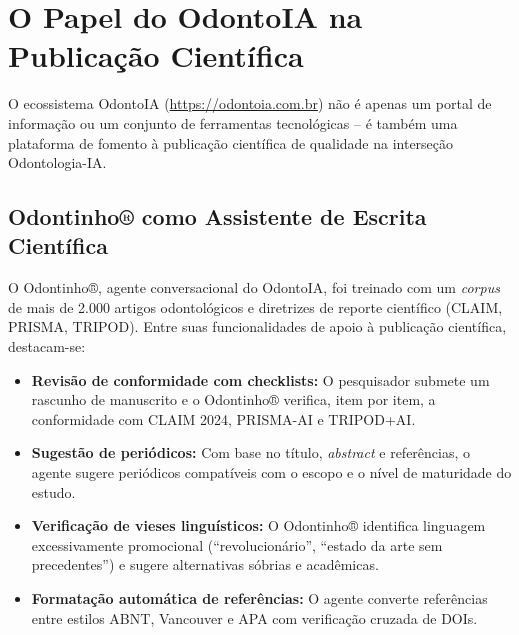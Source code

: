 
\section{O Papel do OdontoIA na Publicação Científica}
\label{sec:odontoia-publicacao}

\nivelquatro

O ecossistema OdontoIA (\url{https://odontoia.com.br}) não é apenas um portal de
informação ou um conjunto de ferramentas tecnológicas -- é também uma plataforma
de fomento à publicação científica de qualidade na interseção Odontologia-IA.

\subsection{Odontinho® como Assistente de Escrita Científica}

O Odontinho®, agente conversacional do OdontoIA, foi treinado com um \textit{
corpus} de mais de 2.000 artigos odontológicos e diretrizes de reporte
científico (CLAIM, PRISMA, TRIPOD). Entre suas funcionalidades de apoio à
publicação científica, destacam-se:

\begin{itemize}
  \item \textbf{Revisão de conformidade com checklists:} O pesquisador submete
    um rascunho de manuscrito e o Odontinho® verifica, item por item, a
    conformidade com CLAIM 2024, PRISMA-AI e TRIPOD+AI.
  \item \textbf{Sugestão de periódicos:} Com base no título, \textit{abstract} e
    referências, o agente sugere periódicos compatíveis com o escopo e o nível
    de maturidade do estudo.
  \item \textbf{Verificação de vieses linguísticos:} O Odontinho® identifica
    linguagem excessivamente promocional (``revolucionário'', ``estado da arte
    sem precedentes'') e sugere alternativas sóbrias e acadêmicas.
  \item \textbf{Formatação automática de referências:} O agente converte
    referências entre estilos ABNT, Vancouver e APA com verificação cruzada de
    DOIs.
\end{itemize}

